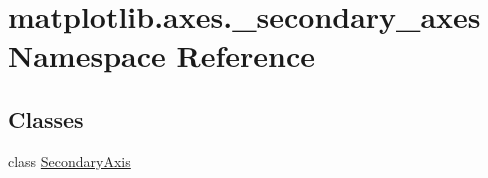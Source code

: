 \hypertarget{namespacematplotlib_1_1axes_1_1__secondary__axes}{}\section{matplotlib.\+axes.\+\_\+secondary\+\_\+axes Namespace Reference}
\label{namespacematplotlib_1_1axes_1_1__secondary__axes}
\subsection*{Classes}
\begin{DoxyCompactItemize}
\item 
class \hyperlink{classmatplotlib_1_1axes_1_1__secondary__axes_1_1SecondaryAxis}{Secondary\+Axis}
\end{DoxyCompactItemize}
